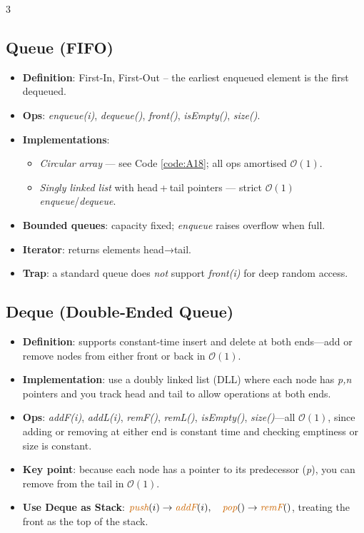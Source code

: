 \documentclass[6pt,landscape]{article}
\newcommand{\bigO}[1]{\ensuremath{\mathcal{O}(#1)}}
\newcommand{\keyword}[1]{\textbf{\textcolor{keywordcolor}{#1}}}
\newcommand{\op}[1]{\textit{\textcolor{opcolor}{#1}}}
\begin{document}
\begin{multicols}{3}
\subsection{Queue (FIFO)}\label{sec:queue}
\begin{itemize}
  \item \keyword{Definition}: First-In, First-Out – the earliest enqueued element is the first dequeued.
  \item \textbf{Ops}: \op{enqueue(i)}, \op{dequeue()}, \op{front()}, \op{isEmpty()}, \op{size()}.
  \item \textbf{Implementations}:
    \begin{itemize}
      \item \emph{Circular array} — see Code \ref{code:A18}; all ops amortised \bigO{1}.
      \item \emph{Singly linked list} with head + tail pointers — strict \bigO{1} \op{enqueue}/\op{dequeue}.
    \end{itemize}
  \item \keyword{Bounded queues}: capacity fixed; \op{enqueue} raises overflow when full.
  \item \keyword{Iterator}: returns elements head→tail.
  \item \textbf{Trap}: a standard queue does \emph{not} support \op{front(i)} for deep random access.
\end{itemize}

\subsection{Deque (Double‐Ended Queue)}\label{sec:deque}
\begin{itemize}
  \item \keyword{Definition}: supports constant‐time insert and delete at both ends—add or remove nodes from either front or back in \bigO{1}.
  \item \textbf{Implementation}: use a doubly linked list (DLL) where each node has \emph{p,n} pointers and you track head and tail to allow operations at both ends.
  \item \textbf{Ops}: \op{addF(i)}, \op{addL(i)}, \op{remF()}, \op{remL()}, \op{isEmpty()}, \op{size()}—all \bigO{1}, since adding or removing at either end is constant time and checking emptiness or size is constant.
  \item \textbf{Key point}: because each node has a pointer to its predecessor (\emph{p}), you can remove from the tail in \bigO{1}.
  \item \keyword{Use Deque as Stack}: 
    \(\op{push}(i) \rightarrow \op{addF}(i),\quad \op{pop}() \rightarrow \op{remF}()\), treating the front as the top of the stack.
\end{itemize}


\end{multicols}
\end{document}
